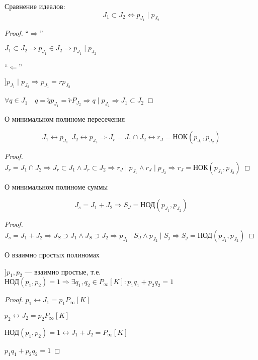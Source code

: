 \begin{lemma}
    Сравнение идеалов:
    $$J_1\subset J_2 \Leftrightarrow p_{J_1}\mid p_{J_2}$$
\end{lemma}
\begin{proof}
    ``$\Rightarrow$''

    $J_1\subset J_2 \Rightarrow p_{J_1}\in J_2 \Rightarrow p_{J_1}\mid p_{J_2}$

    ``$\Leftarrow$''

    $] p_{J_1}\mid p_{J_2} \Rightarrow p_{J_1} = rp_{J_2}$

    $\forall q\in J_1 \quad q=\tilde q p_{J_1}=\tilde r P_{J_2} \Rightarrow q\mid p_{J_2} \Rightarrow J_1\subset J_2$
\end{proof}
\begin{lemma}
    О минимальном полиноме пересечения

    $$J_1\leftrightarrow p_{J_1} \ \ J_2\leftrightarrow p_{J_2} \Rightarrow J_r = J_1\cap J_2 \leftrightarrow r_J=\text{НОК}(p_{J_1}, p_{J_2})$$
\end{lemma}
\begin{proof}
    $J_r=J_1\cap J_2 \Rightarrow J_r\subset J_1 \wedge J_r\subset J_2 \Rightarrow r_J \mid p_{J_1} \wedge r_J\mid p_{J_2} \Rightarrow r_J=\text{НОК}(p_{J_1}, p_{J_2})$
\end{proof}

\begin{lemma}
    О минимальном полиноме суммы

    $$J_s=J_1 + J_2 \Rightarrow S_J=\text{НОД}(p_{J_1}, p_{J_2})$$
\end{lemma}
\begin{proof}
    $J_s=J_1+J_2 \Rightarrow J_S\supset J_1 \wedge J_S\supset J_2 \Rightarrow p_{J_1} \mid S_J \wedge p_{J_2} \mid S_j \Rightarrow S_j=\text{НОД}(p_{J_1}, p_{J_2})$
\end{proof}

\begin{theorem}
    О взаимно простых полиномах

    $] p_1, p_2$ --- взаимно простые, т.е. $\text{НОД}(p_1, p_2)=1 \Rightarrow \exists q_1, q_2\in P_\infty[K] : p_1q_1 + p_2q_2=1$
\end{theorem}
\begin{proof}
    $p_1\leftrightarrow J_1=p_1 P_\infty[K]$

    $p_2\leftrightarrow J_2=p_2 P_\infty[K]$

    $\text{НОД}(p_1, p_2)=1\leftrightarrow J_1+J_2=P_\infty[K]$

    $p_1q_1 + p_2q_2=1$
\end{proof}

